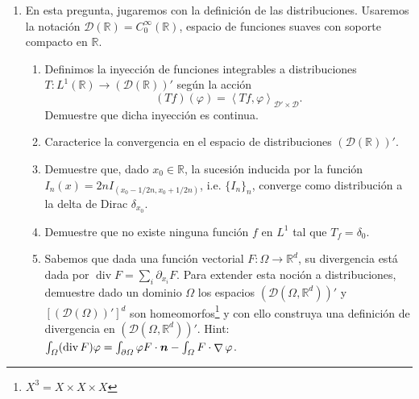 \documentclass{article}
\renewcommand{\vec}{\vectorsym}
\DeclareMathOperator{\grad}{\nabla}
\DeclareMathOperator{\dive}{\text{div}}
\newcommand{\R}{\mathbb{R}}
\newcommand{\pts}[1]{[{\bf #1 puntos}] }
\begin{document}
\begin{enumerate}
    \item En esta pregunta, jugaremos con la definición de las distribuciones. Usaremos la notación $\mathcal D(\R) = C_0^\infty(\R)$, espacio de funciones suaves con soporte compacto en $\R$.
        \begin{enumerate}
            \item\pts{1} Definimos la inyección de funciones integrables a distribuciones $T:L^1(\R) \to \left(\mathcal D(\R)\right)'$ según la acción
                $$ (Tf)(\varphi)  = \left\langle Tf, \varphi\right\rangle_{\mathcal D'\times \mathcal D}.$$
                Demuestre que dicha inyección es continua. 
            \item\pts{1}Caracterice la convergencia en el espacio de distribuciones $\left(\mathcal D(\R)\right)'$. 
            \item\pts{1}Demuestre que, dado $x_0\in \R$,  la sucesión inducida por la función $I_n(x) = 2nI_{(x_0-1/2n, x_0+1/2n)}$, i.e. $\{I_n\}_n$, converge como distribución a la delta de Dirac $\delta_{x_0}$. 
            \item\pts{1}Demuestre que no existe ninguna función $f$ en $L^1$ tal que $T_f = \delta_0$. 
            \item\pts{2} Sabemos que dada una función vectorial $F:\Omega \to \R^d$, su divergencia está dada por $\dive F=\sum_i \partial_{x_i}F$. Para extender esta noción a distribuciones, demuestre dado un dominio $\Omega$ los espacios $(\mathcal D(\Omega, \R^d))'$ y $[(\mathcal D(\Omega))']^d$ son homeomorfos\footnote{$X^3 = X\times X\times X$} y con ello construya una definición de divergencia en $(\mathcal D(\Omega, \R^d))'$. Hint: $\int_\Omega (\dive F)\varphi = \int_{\partial\Omega} \varphi F\cdot \vec n - \int_\Omega F\cdot \grad \varphi$. 
        \end{enumerate}
\end{enumerate}

\end{document}
